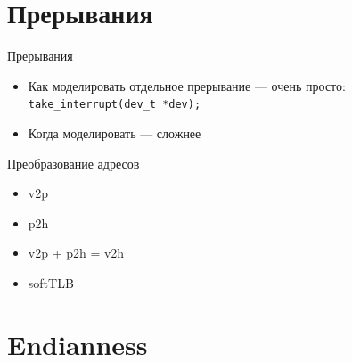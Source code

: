 \documentclass{beamer}
\begin{document}
\section{Прерывания}

\begin{frame}{Прерывания}
\begin{centering}

\end{centering}

\begin{itemize}
\item Как моделировать отдельное прерывание --- очень просто:\\
\texttt{take_interrupt(dev_t *dev);}
\item Когда моделировать --- сложнее
\end{itemize}

\end{frame}


\begin{frame}{Преобразование адресов}
\begin{itemize}
\item v2p
\item p2h
\item v2p + p2h =  v2h
\item softTLB
\end{itemize}
\end{frame}

\section{Endianness}
\end{document}
